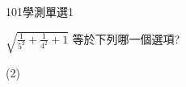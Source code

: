     \begin{QUESTION}
        \begin{ExamInfo}{101}{學測}{單選}{1}
        \end{ExamInfo}
        \begin{ExamAnsRateInfo}{77}{98}{89}{44}
        \end{ExamAnsRateInfo}
        \begin{QBODY}
            $\sqrt{\frac{1}{5^2}+\frac{1}{4^2}+1}$ 等於下列哪一個選項? 
			\begin{QOPS} 
			\end{QOPS}
        \end{QBODY}
        \begin{QFROMS}
        \end{QFROMS}
        \begin{QTAGS}\end{QTAGS}
        \begin{QANS}
            (2)
        \end{QANS}
        \begin{QSOLLIST}
        \end{QSOLLIST}
        \begin{QEMPTYSPACE}
        \end{QEMPTYSPACE}
    \end{QUESTION}
